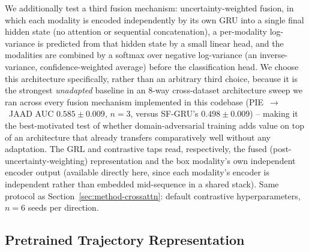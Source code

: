 We additionally test a third fusion mechanism: uncertainty-weighted
fusion, in which each modality is encoded independently by its own GRU
into a single final hidden state (no attention or sequential
concatenation), a per-modality log-variance is predicted from that
hidden state by a small linear head, and the modalities are combined by
a softmax over negative log-variance (an inverse-variance,
confidence-weighted average) before the classification head. We choose
this architecture specifically, rather than an arbitrary third choice,
because it is the strongest \emph{unadapted} baseline in an 8-way
cross-dataset architecture sweep we ran across every fusion mechanism
implemented in this codebase (PIE~$\to$~JAAD AUC $0.585\pm0.009$,
$n=3$, versus SF-GRU's $0.498\pm0.009$) -- making it the best-motivated
test of whether domain-adversarial training adds value on top of an
architecture that already transfers comparatively well without any
adaptation. The GRL and contrastive taps read, respectively, the fused
(post-uncertainty-weighting) representation and the box modality's own
independent encoder output (available directly here, since each
modality's encoder is independent rather than embedded mid-sequence in
a shared stack). Same protocol as Section~\ref{sec:method-crossattn}:
default contrastive hyperparameters, $n=6$ seeds per direction.

\subsection{Pretrained Trajectory Representation}
\label{sec:method-pretrained-traj}

